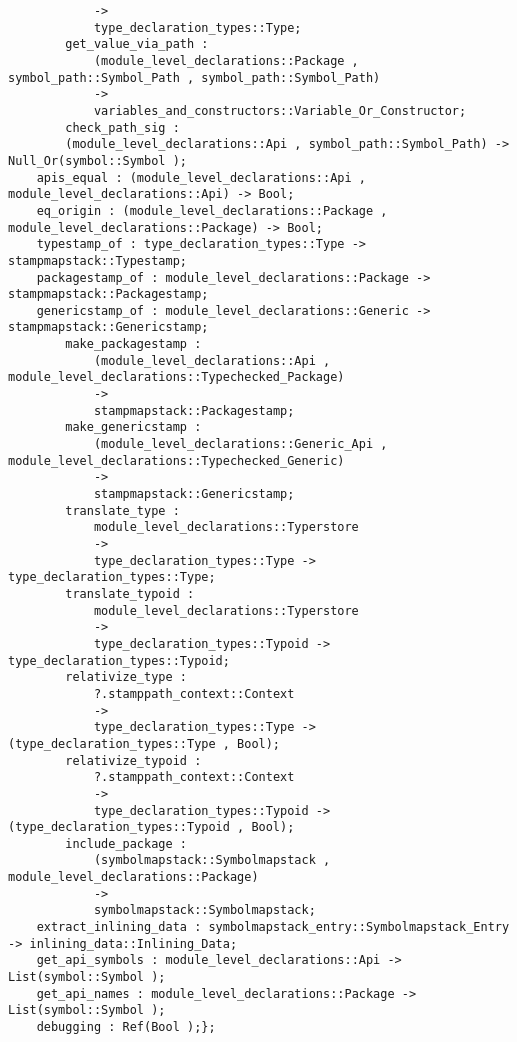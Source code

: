 \begin{verbatim}
            ->
            type_declaration_types::Type;
        get_value_via_path :
            (module_level_declarations::Package , symbol_path::Symbol_Path , symbol_path::Symbol_Path)
            ->
            variables_and_constructors::Variable_Or_Constructor;
        check_path_sig :
        (module_level_declarations::Api , symbol_path::Symbol_Path) -> Null_Or(symbol::Symbol );
    apis_equal : (module_level_declarations::Api , module_level_declarations::Api) -> Bool;
    eq_origin : (module_level_declarations::Package , module_level_declarations::Package) -> Bool;
    typestamp_of : type_declaration_types::Type -> stampmapstack::Typestamp;
    packagestamp_of : module_level_declarations::Package -> stampmapstack::Packagestamp;
    genericstamp_of : module_level_declarations::Generic -> stampmapstack::Genericstamp;
        make_packagestamp :
            (module_level_declarations::Api , module_level_declarations::Typechecked_Package)
            ->
            stampmapstack::Packagestamp;
        make_genericstamp :
            (module_level_declarations::Generic_Api , module_level_declarations::Typechecked_Generic)
            ->
            stampmapstack::Genericstamp;
        translate_type :
            module_level_declarations::Typerstore
            ->
            type_declaration_types::Type -> type_declaration_types::Type;
        translate_typoid :
            module_level_declarations::Typerstore
            ->
            type_declaration_types::Typoid -> type_declaration_types::Typoid;
        relativize_type :
            ?.stamppath_context::Context
            ->
            type_declaration_types::Type -> (type_declaration_types::Type , Bool);
        relativize_typoid :
            ?.stamppath_context::Context
            ->
            type_declaration_types::Typoid -> (type_declaration_types::Typoid , Bool);
        include_package :
            (symbolmapstack::Symbolmapstack , module_level_declarations::Package)
            ->
            symbolmapstack::Symbolmapstack;
    extract_inlining_data : symbolmapstack_entry::Symbolmapstack_Entry -> inlining_data::Inlining_Data;
    get_api_symbols : module_level_declarations::Api -> List(symbol::Symbol );
    get_api_names : module_level_declarations::Package -> List(symbol::Symbol );
    debugging : Ref(Bool );};
\end{verbatim}
